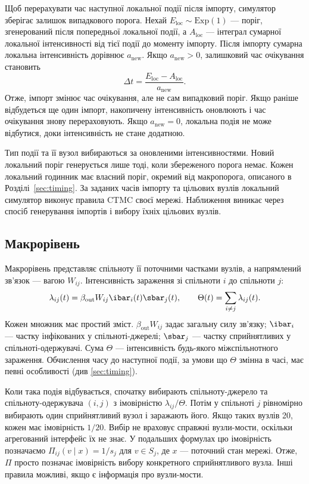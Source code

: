 Щоб перерахувати час наступної локальної події після імпорту, симулятор зберігає залишок випадкового порога. Нехай $E_{\mathrm{loc}}\sim\mathrm{Exp}(1)$ --- поріг,
згенерований після попередньої локальної події, а
$A_{\mathrm{loc}}$ --- інтеграл сумарної локальної
інтенсивності від тієї події до моменту імпорту.
Після імпорту сумарна локальна інтенсивність
дорівнює $a_{\mathrm{new}}$. Якщо $a_{\mathrm{new}}>0$,
залишковий час очікування становить
\[
\Delta t=
\frac{E_{\mathrm{loc}}-A_{\mathrm{loc}}}{a_{\mathrm{new}}}.
\]
Отже, імпорт змінює час очікування, але не сам випадковий
поріг. Якщо раніше відбудеться ще один імпорт, накопичену
інтенсивність оновлюють і час очікування знову
перераховують. Якщо $a_{\mathrm{new}}=0$, локальна подія
не може відбутися, доки інтенсивність не стане додатною.

Тип події та її вузол вибираються за оновленими інтенсивностями. Новий локальний поріг генерується лише тоді, коли збереженого порога немає. Кожен локальний годинник має власний поріг, окремий від макропорога, описаного в Розділі~\ref{sec:timing}. За заданих часів імпорту та цільових вузлів локальний симулятор виконує правила CTMC своєї мережі. Наближення виникає через спосіб генерування імпортів і вибору їхніх цільових вузлів.

\subsection{Макрорівень}
\label{sec:macro}

Макрорівень представляє спільноту її поточними частками вузлів, а напрямлений зв'язок --- вагою $W_{ij}$. Інтенсивність зараження зі спільноти $i$ до спільноти $j$:
\begin{equation}
\label{eq:macro_rate}
\lambda_{ij}(t)=\beta_{\mathrm{out}}W_{ij}\ibar_i(t)\sbar_j(t),
\qquad \Theta(t)=\sum_{i\neq j}\lambda_{ij}(t).
\end{equation}
Кожен множник має простий зміст. $\beta_{\mathrm{out}}W_{ij}$ задає загальну силу зв'язку; $\ibar_i$ --- частку інфікованих у спільноті-джерелі; $\sbar_j$ --- частку сприйнятливих у спільноті-одержувачі. Сума $\Theta$ --- інтенсивність будь-якого міжспільнотного зараження. Обчислення часу до наступної події, за умови що $\Theta$ змінна в часі, має певні особливості (див \ref{sec:timing}).

Коли така подія відбувається, спочатку вибирають спільноту-джерело та спільноту-одержувача $(i,j)$ з імовірністю $\lambda_{ij}/\Theta$. Потім у спільноті $j$ рівномірно вибирають один сприйнятливий вузол і заражають його. Якщо таких вузлів 20, кожен має імовірність $1/20$. Вибір не враховує справжні вузли-мости, оскільки агрегований інтерфейс їх не знає. У подальших формулах цю імовірність позначаємо $\Pi_{ij}(v\mid x)=1/s_j$ для $v\in S_j$, де $x$ --- поточний стан мережі. Отже, $\Pi$ просто позначає імовірність вибору конкретного сприйнятливого вузла. Інші правила можливі, якщо є інформація про вузли-мости. 

